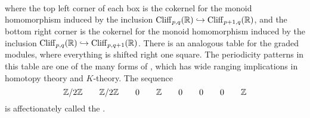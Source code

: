 \\\\\\
where the top left corner of each box is the cokernel for the monoid homomorphism
induced by the inclusion $\operatorname{Cliff}_{p,q}(\mathbb{R}) \hookrightarrow \operatorname{Cliff}_{p+1,q}(\mathbb{R})$,
and the bottom right  corner is the cokernel for the monoid homomorphism induced
by the inclusion $\operatorname{Cliff}_{p,q}(\mathbb{R}) \hookrightarrow \operatorname{Cliff}_{p,q+1}(\mathbb{R})$. There
is an analogous table for the graded modules, where everything is shifted right
one square. The periodicity patterns in this table are one of the many
forms of , which has wide ranging implications in homotopy
theory and $K$-theory. The sequence
\[
\mathbb{Z}/2\mathbb{Z} \qquad \mathbb{Z}/2\mathbb{Z} \qquad 0 \qquad \mathbb{Z} \qquad 0 \qquad 0 \qquad 0 \qquad \mathbb{Z}
\]
is affectionately called the .
%